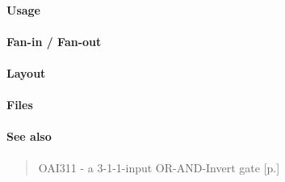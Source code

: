 \paragraph{Usage}

\paragraph{Fan-in / Fan-out}

\paragraph{Layout}

\paragraph{Files}

\paragraph{See also}
\begin{quote}
    OAI311 - a 3-1-1-input OR-AND-Invert gate [p.\pageref{OAI311}] \\
\end{quote}
